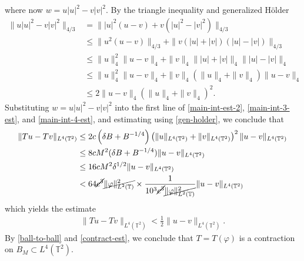 \documentclass[12pt,reqno]{amsart}
\newcommand{\ci}{\mathbb{T}}
\newcommand{\vp}{\varphi}
\theoremstyle{plain}  %
\begin{document}
%
%
where now $w = u|u|^2 - v|v|^2$. By the triangle inequality and generalized
H\"{o}lder
%
%
\begin{equation}
	\label{gen-holder}
	\begin{split}
		\|u |u|^2 - v |v|^2\|_{4/3}
		& = \| |u|^2\left( u -v \right) + v\left( |u|^2 - |v|^2 
		\right)\|_{4/3}
		\\
		& \le \|u^2\left( u -v \right)\|_{4/3} + \|v\left( |u| + |v| 
		\right)\left( |u| - |v| \right) \|_{4/3}
		\\
		& \le \|u\|_4^2 \|u -v \|_4 + \|v\|_4  \| |u| + |v| \|_4 
		\| |u| - |v |\|_4 
		\\
		& \le \|u \|_4^2 \|u -v\|_4 + \|v\|_4\left( \|u\|_4 + \|v\|_4 
		\right) \|u -v \|_4
		\\
		& \le 2 \|u -v \|_4 \left(  \|u\|_4 + \|v\|_4 \right)^2.
	\end{split}
\end{equation}
%
%
Substituting $w = u|u|^2 - v|v|^2$ into the first line of \eqref{main-int-est-2}, 
\eqref{main-int-3-est}, and \eqref{main-int-4-est}, and estimating using  
\eqref{gen-holder}, we conclude that
%
%
\begin{equation*}
	\begin{split}
		\|Tu - Tv\|_{L^4(\ci^2)}
		& \le 2c\left( \delta B + B^{-1/4} 
		\right)\left( \|u\|_{L^4(\ci^2)} +
		\|v\|_{L^4(\ci^2)}\right)^2 \|u -v \|_{L^4(\ci^2)}
		\\
		& \le 8 c M^2(\delta B + B^{-1/4}) \|u - v\|_{L^4(\ci^2)}
		\\
		& \le 16cM^2 \delta^{1/2} \|u-v\|_{L^4(\ci^2)}
		\\
		& < 64 \cancel{c^3} \cancel{\|\vp\|_{L^2(\ci)}^2}
		\times \frac{1}{10^3 \cancel{c^3} \cancel{\|\vp\|_{L^2(\ci)}^2}}
		\|u-v\|_{L^4(\ci^2)}
	\end{split}
\end{equation*}
%
%
which yields the estimate
%
%
\begin{equation}
	\label{contract-est}
	\begin{split}
		\|Tu - Tv\|_{L^4(\ci^2)} < \frac{1}{2} \|u -v \|_{L^4(\ci^2)}.
	\end{split}
\end{equation}
%
%
By \eqref{ball-to-ball} and \eqref{contract-est}, we conclude that
$T = T(\vp)$ is a contraction on $B_M \subset L^4(\ci^2)$. 
%
%

%
%
\newpage
\end{document}
